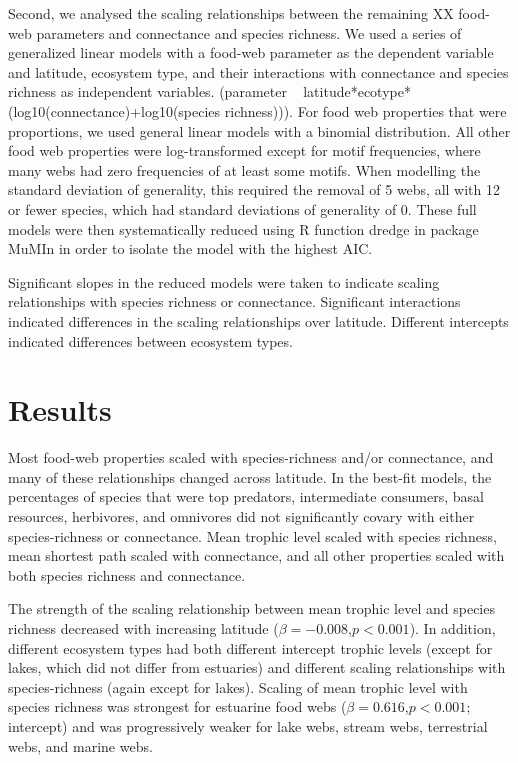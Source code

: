 Second, we analysed the scaling relationships between the remaining XX food-
web parameters and connectance and species richness. We used a series of
generalized linear models with a food-web parameter as the dependent variable
and latitude, ecosystem type, and their interactions with connectance and
species richness as independent variables. (parameter ~
latitude*ecotype*(log10(connectance)+log10(species richness))). For food web
properties that were proportions, we used general linear models with a
binomial distribution. All other food web properties were log-transformed
except for motif frequencies, where many webs had zero frequencies of at least
some motifs. When modelling the standard deviation of generality, this
required the removal of 5 webs, all with 12 or fewer species, which had
standard deviations of generality of 0. These full models were then
systematically reduced using R function dredge \cite{} in package MuMIn
\cite{} in order to isolate the model with the highest AIC.


Significant slopes in the reduced models were taken to indicate scaling
relationships with species richness or connectance. Significant interactions
indicated differences in the scaling relationships over latitude. Different
intercepts indicated differences between ecosystem types.


\section*{Results}

Most food-web properties scaled with species-richness and/or connectance, and many of these relationships changed across latitude.
In the best-fit models, the percentages of species that were top predators, intermediate consumers, basal resources, herbivores, and omnivores did not significantly covary with either species-richness or connectance.
Mean trophic level scaled with species richness, mean shortest path scaled with connectance, and all other properties scaled with both species richness and connectance.


The strength of the scaling relationship between mean trophic level and species richness decreased with increasing latitude ($\beta=-0.008$,$p<0.001$). In addition, different ecosystem types had both different intercept trophic levels (except for lakes, which did not differ from estuaries) and different scaling relationships with species-richness (again except for lakes). Scaling of mean trophic level with species richness was strongest for estuarine food webs ($\beta=0.616$,$p<0.001$; intercept) and was progressively weaker for lake webs, stream webs, terrestrial webs, and marine webs.


